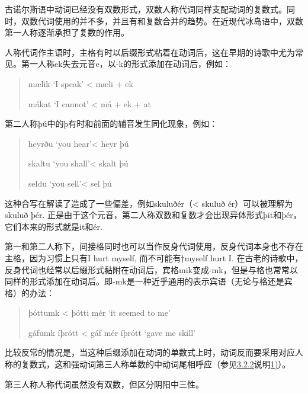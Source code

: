 古诺尔斯语中动词已经没有双数形式，双数人称代词同样支配动词的复数式。同时，双数代词使用的并不多，并且有和复数合并的趋势。在近现代冰岛语中，双数第一人称逐渐承担了复数的作用。

人称代词作主语时，主格有时以后缀形式粘着在动词后，这在早期的诗歌中尤为常见。第一人称ek失去元音e，以-k的形式添加在动词后，例如：

\begin{quote}
  mælik `I speak‌' \textless{} mæli + ek

  mákat `I cannot‌' \textless{} má + ek + at
\end{quote}

第二人称þú中的þ有时和前面的辅音发生同化现象，例如：

\begin{quote}
  heyrðu `you hear'\textless{} heyr þú

  skaltu `you shall'\textless{} skalt þú

  seldu `you sell'\textless{} sel þú
\end{quote}

这种合写在解读了造成了一些偏差，例如skuluðér（\textless{} skuluð
ér）可以被理解为skuluð þér.
正是由于这个元音，第二人称双数和复数才会出现异体形式þit和þér，它们本来的形式就是it和ér.

第一和第二人称下，间接格同时也可以当作反身代词使用，反身代词本身也不存在主格，因为习惯上只有I
hurt myself, 而不可能有†myself hurt I.
在古老的诗歌中，反身代词也经常以后缀形式黏附在动词后，宾格mik变成-mk，但是与格也常常以同样的形式添加在动词后。即-mk是一种近乎通用的表示宾语（无论与格还是宾格）的办法：

\begin{quote}
  þóttumk \textless{} þótti mér `it seemed to me‌'

  gáfumk íþrótt \textless{} gáf mér íþrótt `gave me skill'
\end{quote}

比较反常的情况是，当这种后缀添加在动词的单数式上时，动词反而要采用对应人称的复数式，这和强动词第三人称单数的中动词尾相呼应（参见\hyperref[ux5f3aux52a8ux8bcdux7684ux4e2dux52a8ux8bcdux5c3e]{3.2.2}说明\hyperref[_Ref117719619]{1)}）。

第三人称人称代词虽然没有双数，但区分阴阳中三性。

